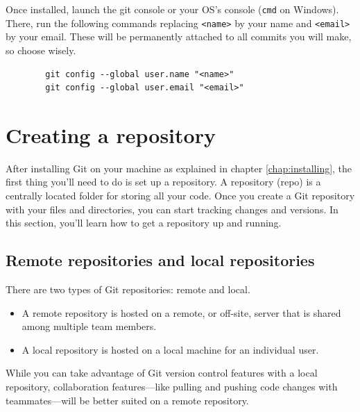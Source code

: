 \documentclass[10pt,a4paper,english]{report}
\begin{document}
    Once installed, launch the git console or your OS's console (\verb|cmd| on Windows).
    There, run the following commands replacing \verb|<name>| by your name and \verb|<email>| by your email. These will be permanently attached to all commits you will make, so choose wisely.

    \begin{verbatim}
        git config --global user.name "<name>"
        git config --global user.email "<email>"
    \end{verbatim}

\chapter{Creating a repository}

    After installing Git on your machine as explained in chapter \ref{chap:installing}, the first thing you'll need to do is set up a repository. A repository (repo) is a centrally located folder for storing all your code. Once you create a Git repository with your files and directories, you can start tracking changes and versions. In this section, you'll learn how to get a repository up and running.

    \section{Remote repositories and local repositories}

    There are two types of Git repositories: remote and local.
    \begin{itemize}
        \item A remote repository is hosted on a remote, or off-site, server that is shared among multiple team members.
        \item A local repository is hosted on a local machine for an individual user.
    \end{itemize}

    While you can take advantage of Git version control features with a local repository, collaboration features—like pulling and pushing code changes with teammates—will be better suited on a remote repository.
\end{document}
